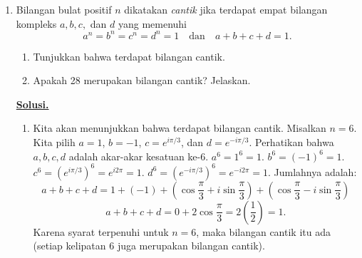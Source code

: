 \documentclass[12pt,twoside]{article}
\newenvironment{solution}
{
	\par\noindent\textbf{\underline{Solusi.}}\\
}
{
	\par
}
\begin{document}
\begin{enumerate}
  \item Bilangan bulat positif $n$ dikatakan \textit{cantik} jika terdapat empat bilangan kompleks $a, b, c,$ dan $d$ yang memenuhi
        \[
          a^n = b^n = c^n = d^n = 1 \quad \text{dan} \quad a + b + c + d = 1.
        \]
        \begin{enumerate}
          \item Tunjukkan bahwa terdapat bilangan cantik.
          \item Apakah 28 merupakan bilangan cantik? Jelaskan.
        \end{enumerate}

        \begin{solution}
          \begin{enumerate}
            \item Kita akan menunjukkan bahwa terdapat bilangan cantik. Misalkan $n = 6$.
                  Kita pilih $a = 1$, $b = -1$, $c = e^{i \pi / 3}$, dan $d = e^{-i \pi / 3}$.
                  Perhatikan bahwa $a, b, c, d$ adalah akar-akar kesatuan ke-6.
                  $a^6 = 1^6 = 1$.
                  $b^6 = (-1)^6 = 1$.
                  $c^6 = (e^{i \pi / 3})^6 = e^{i 2\pi} = 1$.
                  $d^6 = (e^{-i \pi / 3})^6 = e^{-i 2\pi} = 1$.
                  Jumlahnya adalah:
                  \[ a + b + c + d = 1 + (-1) + \left(\cos \frac{\pi}{3} + i \sin \frac{\pi}{3}\right) + \left(\cos \frac{\pi}{3} - i \sin \frac{\pi}{3}\right) \]
                  \[ a + b + c + d = 0 + 2 \cos \frac{\pi}{3} = 2 \left(\frac{1}{2}\right) = 1. \]
                  Karena syarat terpenuhi untuk $n=6$, maka bilangan cantik itu ada (setiap kelipatan 6 juga merupakan bilangan cantik).


\end{enumerate}
\end{solution}
\end{enumerate}
\end{document}

